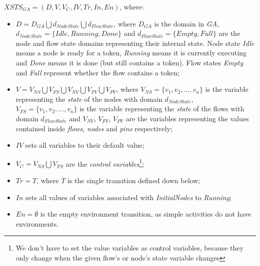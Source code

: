 \begin{definition}
	\( \mathit{XSTS_{GA}} = (D, V, V_C, \mathit{IV}, \mathit{Tr}, \mathit{In}, \mathit{En}) \), where:
	
	\begin{itemize}
		\item \( D = D_\mathit{GA} \bigcup d_\mathit{NodeState} \bigcup d_\mathit{FlowState} \), where \(D_\mathit{GA}\) is the domain in \emph{GA}, \(d_\mathit{NodeState} = \{ \mathit{Idle}, \mathit{Running}, \mathit{Done} \} \) and \(d_\mathit{FlowState} = \{ \mathit{Empty}, \mathit{Full} \} \) are the node and flow state domains representing their internal state. Node state \emph{Idle} means a node is ready for a token, \emph{Running} means it is currently executing and \emph{Done} means it is done (but still contains a token). Flow states \emph{Empty} and \emph{Full} represent whether the flow contains a token;
		\item \( V = V_\mathit{NS} \bigcup V_\mathit{FS} \bigcup V_\mathit{NV} \bigcup V_\mathit{FV} \bigcup V_\mathit{PV} \), where \(V_\mathit{NS} = \{ v_1, v_2, \dots, v_n \} \) is the variable representing the \emph{state} of the nodes with domain \(d_\mathit{NodeState}\), \(V_\mathit{FS} = \{ v_1, v_2, \dots, v_n \} \) is the variable representing the \emph{state} of the flows with domain \(d_\mathit{FlowState}\) and \( V_\mathit{NV} \), \( V_\mathit{FV} \), \( V_\mathit{PV} \) are the variables representing the values contained inside \emph{flows}, \emph{nodes} and \emph{pins} respectively;
		\item \( IV \) sets all variables to their default value;
		\item \( V_C = V_\mathit{NS} \bigcup V_\mathit{FS} \) are the \emph{control variables}\footnote{We don't have to set the value variables as control variables, because they only change when the given flow's or node's state variable changes};
		\item \( \mathit{Tr} = T \), where \(T\) is the single transition defined down below;
		\item \( \mathit{In} \) sets all values of variables associated with \emph{InitialNodes} to \emph{Running};
		\item \( \mathit{En} = \emptyset \) is the empty environment transition, as simple activities do not have environments.
	\end{itemize}
	
\end{definition}\label{def:activity-state}

